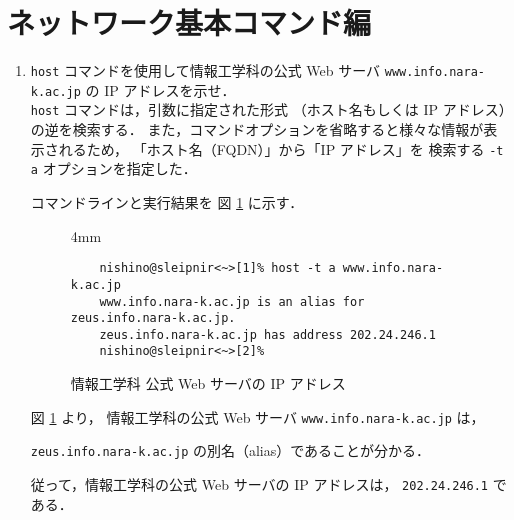 \documentclass[a4j]{jreport}
\begin{document}
\section{ネットワーク基本コマンド編}
\begin{enumerate}[labelindent=\parindent, leftmargin=*, label=課題 \arabic*）]
  \item \texttt{host} コマンドを使用して情報工学科の公式 Web サーバ
	\texttt{www.info.nara-k.ac.jp} の IP アドレスを示せ．\\

	\texttt{host} コマンドは，引数に指定された形式
	（ホスト名もしくは IP アドレス）の逆を検索する．
	また，コマンドオプションを省略すると様々な情報が表示されるため，
	「ホスト名（FQDN）」から「IP アドレス」を
	検索する \texttt{-t a} オプションを指定した．

	コマンドラインと実行結果を
	図 \ref{Figure: host www.info.nara-k.ac.jp} に示す．

	  \begin{figure}[H]
	    \centering
	      \begin{screen}[3]
	        \setlength{\baselineskip} {4mm}
	        \begin{verbatim}
	nishino@sleipnir<~>[1]% host -t a www.info.nara-k.ac.jp
	www.info.nara-k.ac.jp is an alias for zeus.info.nara-k.ac.jp.
	zeus.info.nara-k.ac.jp has address 202.24.246.1
	nishino@sleipnir<~>[2]%
	        \end{verbatim}
	        \vspace*{-18pt}
	      \end{screen}
	      \caption{情報工学科 公式 Web サーバの IP アドレス}
	      \label{Figure: host www.info.nara-k.ac.jp}
	  \end{figure}

	図 \ref{Figure: host www.info.nara-k.ac.jp} より，
	情報工学科の公式 Web サーバ \texttt{www.info.nara-k.ac.jp} は，

	\noindent
	\texttt{zeus.info.nara-k.ac.jp} の別名（alias）であることが分かる．

	従って，情報工学科の公式 Web サーバの IP アドレスは，
	\texttt{202.24.246.1} である．
\end{enumerate}



\newpage				%
\end{document}
